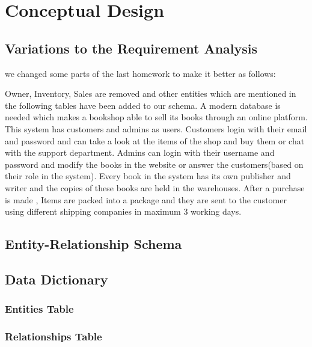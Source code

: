 \section{Conceptual Design}

\subsection{Variations to the Requirement Analysis}
we changed some parts of the last homework to make it better as follows:

Owner, Inventory, Sales are removed and other entities which are mentioned in the following tables have been added to our schema. 
A modern database is needed which makes a bookshop able to sell its books through an online platform. This system has customers and admins as users. Customers login with their email and password and can take a look at the items of the shop and buy them or chat with the support department. Admins can login with their username and password and modify the books in the website or answer the customers(based on their role in the system). Every book in the system has its own publisher and writer and the copies of these books are held in the warehouses. After a purchase is made , Items are packed into a package and they are sent to the customer using different shipping companies in maximum 3 working days.
\subsection{Entity-Relationship Schema}

\subsection{Data Dictionary}

\subsubsection{Entities Table}



\subsubsection{Relationships Table}


